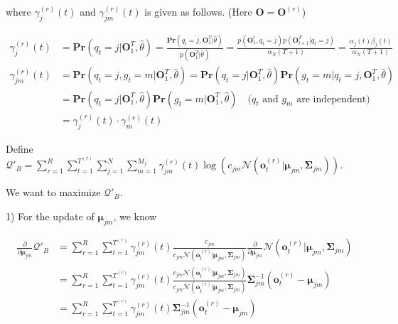 \documentclass{article}
\renewcommand{\Pr}[1]{\mathbf{Pr}\left(#1\right)}
\begin{document}
    where $\gamma_{j}^{(r)}(t)$ and $\gamma_{jm}^{(r)}(t)$ is given as follows. (Here $\mathbf{O}=\mathbf{O}^{(r)}$)
    
    \vspace{-2.5em}
    \begin{align*}
        \gamma_{j}^{(r)}(t)&=\Pr{q_t=j|\mathbf{O}_1^{T},\hat{\theta}} = \frac{\Pr{q_t=j,\mathbf{O}_1^T|\hat{\theta}}}{p(\mathbf{O}_1^T|\hat{\theta})} = \frac{p(\mathbf{O}_1^t,q_t=j)p(\mathbf{O}_{t+1}^T|q_t=j)}{\alpha_N(T+1)} = \frac{\alpha_j(t)\beta_j(t)}{\alpha_N(T+1)} \\
        \gamma_{jm}^{(r)}(t)&=\Pr{q_t=j,g_t=m|\mathbf{O}_1^T,\hat{\theta}}=\Pr{q_t=j|\mathbf{O}_1^T,\hat{\theta}}\Pr{g_t=m|q_t=j,\mathbf{O}_1^T,\hat{\theta}} \\
        &= \Pr{q_t=j|\mathbf{O}_1^T,\hat{\theta}}\Pr{g_t=m|\mathbf{O}_1^T,\hat{\theta}}\quad\text{($q_t$ and $g_m$ are independent)} \\
        &= \gamma_j^{(r)}(t)\cdot\gamma_m^{(r)}(t)
    \end{align*}
    
    \vspace{1em}
    Define $\mathcal{Q}'_B=\sum_{r=1}^R\sum_{t=1}^{T^{(r)}}\sum_{j=1}^N\sum_{m=1}^{M_j}\gamma_{jm}^{(r)}(t)\log\left(c_{jm}\mathcal{N}\left(\mathbf{o}^{(r)}_t|\boldsymbol{\mu}_{jm},\boldsymbol{\Sigma}_{jm}\right)\right)$. 
    
    We want to maximize $\mathcal{Q}'_B.$
    
\hspace{-2.2em}
1)\quad
    For the update of $\boldsymbol{\mu}_{jm}$, we know
    
    \vspace{-2.7em}
    \begin{align*}
        \frac{\partial}{\partial\boldsymbol{\mu}_{jm}}\mathcal{Q}'_B &= \sum_{r=1}^R\sum_{t=1}^{T^{(r)}}\gamma_{jm}^{(r)}(t)\frac{c_{jm}}{c_{jm}\mathcal{N}\left(\mathbf{o}^{(r)}_t|\boldsymbol{\mu}_{jm},\boldsymbol{\Sigma}_{jm}\right)}\frac{\partial}{\partial\boldsymbol{\mu}_{jm}}\mathcal{N}\left(\mathbf{o}^{(r)}_t|\boldsymbol{\mu}_{jm},\boldsymbol{\Sigma}_{jm}\right) \\
        &= \sum_{r=1}^R\sum_{t=1}^{T^{(r)}}\gamma_{jm}^{(r)}(t)\frac{c_{jm}\mathcal{N}\left(\mathbf{o}^{(r)}_t|\boldsymbol{\mu}_{jm},\boldsymbol{\Sigma}_{jm}\right)}{c_{jm}\mathcal{N}\left(\mathbf{o}^{(r)}_t|\boldsymbol{\mu}_{jm},\boldsymbol{\Sigma}_{jm}\right)}\boldsymbol{\Sigma}_{jm}^{-1}\left(\mathbf{o}_t^{(r)}-\boldsymbol{\mu}_{jm}\right) \\
        &= \sum_{r=1}^R\sum_{t=1}^{T^{(r)}}\gamma_{jm}^{(r)}(t)\boldsymbol{\Sigma}_{jm}^{-1}\left(\mathbf{o}_t^{(r)}-\boldsymbol{\mu}_{jm}\right)
    \end{align*}
    
\end{document}

